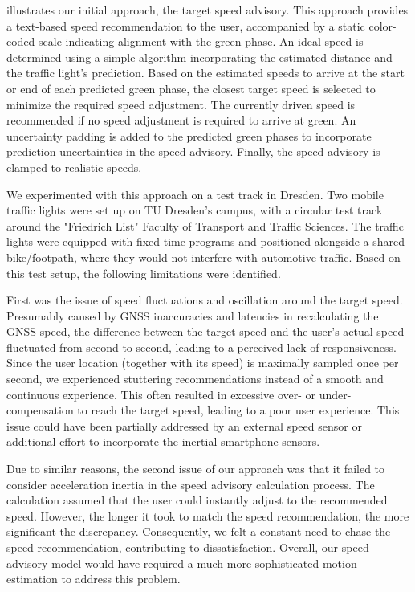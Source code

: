  illustrates our initial approach, the target speed advisory. This approach provides a text-based speed recommendation to the user, accompanied by a static color-coded scale indicating alignment with the green phase. An ideal speed is determined using a simple algorithm incorporating the estimated distance and the traffic light's prediction. Based on the estimated speeds to arrive at the start or end of each predicted green phase, the closest target speed is selected to minimize the required speed adjustment. The currently driven speed is recommended if no speed adjustment is required to arrive at green. An uncertainty padding is added to the predicted green phases to incorporate prediction uncertainties in the speed advisory. Finally, the speed advisory is clamped to realistic speeds.

We experimented with this approach on a test track in Dresden. Two mobile traffic lights were set up on TU Dresden's campus, with a circular test track around the "Friedrich List" Faculty of Transport and Traffic Sciences. The traffic lights were equipped with fixed-time programs and positioned alongside a shared bike/footpath, where they would not interfere with automotive traffic. Based on this test setup, the following limitations were identified.

First was the issue of speed fluctuations and oscillation around the target speed. Presumably caused by GNSS inaccuracies and latencies in recalculating the GNSS speed, the difference between the target speed and the user's actual speed fluctuated from second to second, leading to a perceived lack of responsiveness. Since the user location (together with its speed) is maximally sampled once per second, we experienced stuttering recommendations instead of a smooth and continuous experience. This often resulted in excessive over- or under-compensation to reach the target speed, leading to a poor user experience. This issue could have been partially addressed by an external speed sensor or additional effort to incorporate the inertial smartphone sensors.

Due to similar reasons, the second issue of our approach was that it failed to consider acceleration inertia in the speed advisory calculation process. The calculation assumed that the user could instantly adjust to the recommended speed. However, the longer it took to match the speed recommendation, the more significant the discrepancy. Consequently, we felt a constant need to chase the speed recommendation, contributing to dissatisfaction. Overall, our speed advisory model would have required a much more sophisticated motion estimation to address this problem.


